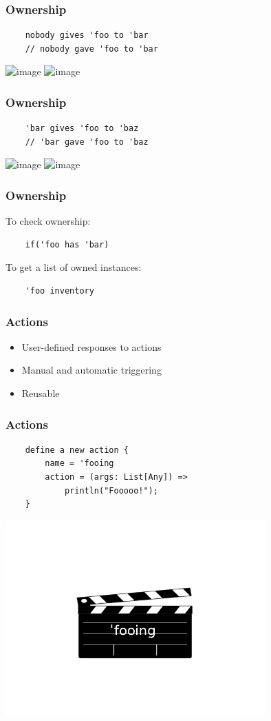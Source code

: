\documentclass{beamer}
\begin{document}
\begin{frame}[fragile]
    \frametitle{Ownership}
    \begin{lstlisting}
    nobody gives 'foo to 'bar
    // nobody gave 'foo to 'bar
    \end{lstlisting}
    \includegraphics<1>[width=13cm]{nobody-gives1}
    \includegraphics<2>[width=13cm]{nobody-gives2}
\end{frame}

\begin{frame}[fragile]
    \frametitle{Ownership}
    \begin{lstlisting}
    'bar gives 'foo to 'baz
    // 'bar gave 'foo to 'baz
    \end{lstlisting}
    \includegraphics<1>[width=13cm]{bar-gives1}
    \includegraphics<2>[width=13cm]{bar-gives2}
\end{frame}

\begin{frame}[fragile]
    \frametitle{Ownership}
    To check ownership:
    \begin{lstlisting}
    if('foo has 'bar)
    \end{lstlisting}

    To get a list of owned instances:
    \begin{lstlisting}
    'foo inventory
    \end{lstlisting}
\end{frame}

\begin{frame}
    \frametitle{Actions}
    \begin{itemize}[<+->]
        \item{User-defined responses to actions}
        \item{Manual and automatic triggering}
        \item{Reusable}
    \end{itemize}
\end{frame}

\begin{frame}[fragile]
    \frametitle{Actions}
    \begin{lstlisting}
    define a new action {
        name = 'fooing
        action = (args: List[Any]) =>
            println("Fooooo!");
    }
    \end{lstlisting}
    \includegraphics[width=10cm]{fooing}
\end{frame}
\end{document}
